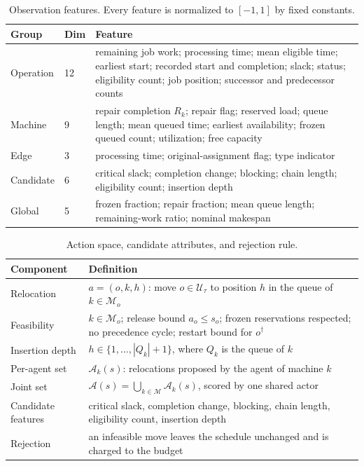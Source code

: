 \documentclass[conference]{IEEEtran}
\theoremstyle{remark}
\newcommand{\cA}{\mathcal{A}}
\newcommand{\cU}{\mathcal{U}}
\newcommand{\cM}{\mathcal{M}}
\begin{document}
\begin{table}[!t]
\caption{Observation features. Every feature is normalized to $[-1,1]$ by fixed constants.}
\label{tab:S-state}
\centering
\scriptsize
\setlength{\tabcolsep}{3pt}
\begin{tabular}{@{}p{1.15cm}p{0.45cm}p{5.0cm}@{}}
\toprule
\textbf{Group} & \textbf{Dim} & \textbf{Feature}\\
\midrule
Operation & 12 & remaining job work; processing time; mean eligible time; earliest start; recorded start and completion; slack; status; eligibility count; job position; successor and predecessor counts\\
Machine & 9 & repair completion $R_k$; repair flag; reserved load; queue length; mean queued time; earliest availability; frozen queued count; utilization; free capacity\\
Edge & 3 & processing time; original-assignment flag; type indicator\\
Candidate & 6 & critical slack; completion change; blocking; chain length; eligibility count; insertion depth\\
Global & 5 & frozen fraction; repair fraction; mean queue length; remaining-work ratio; nominal makespan\\
\bottomrule
\end{tabular}
\end{table}

\begin{table}[!t]
\caption{Action space, candidate attributes, and rejection rule.}
\label{tab:S-action}
\centering
\scriptsize
\setlength{\tabcolsep}{3pt}
\begin{tabular}{@{}p{1.55cm}p{5.55cm}@{}}
\toprule
\textbf{Component} & \textbf{Definition}\\
\midrule
Relocation & $a=(o,k,h)$: move $o\in\cU_\tau$ to position $h$ in the queue of $k\in\cM_o$\\
Feasibility & $k\in\cM_o$; release bound $a_o\le s_o$; frozen reservations respected; no precedence cycle; restart bound for $o^{\dagger}$\\
Insertion depth & $h\in\{1,\ldots,|Q_k|+1\}$, where $Q_k$ is the queue of $k$\\
Per-agent set & $\cA_k(s)$: relocations proposed by the agent of machine $k$\\
Joint set & $\cA(s)=\bigcup_{k\in\cM}\cA_k(s)$, scored by one shared actor\\
Candidate features & critical slack, completion change, blocking, chain length, eligibility count, insertion depth\\
Rejection & an infeasible move leaves the schedule unchanged and is charged to the budget\\
\bottomrule
\end{tabular}
\end{table}
\end{document}
